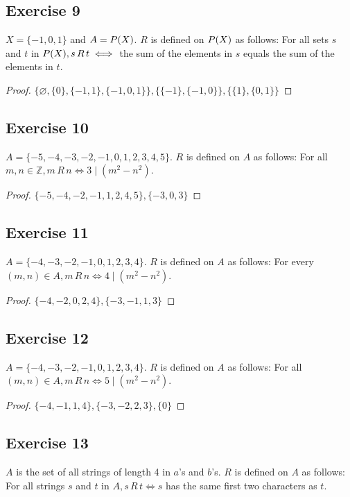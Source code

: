 \documentclass[14pt]{extarticle}
\let\mathscr\relax
\newcommand{\ps}{\mathscr{P}} %
\newcommand{\es}{\varnothing}
\newcommand{\Z}{\mathbb{Z}}
\begin{document}
\subsection{Exercise 9}
\(X = \{-1, 0, 1\}\) and \(A = \ps(X)\). \(R\) is defined on \(\ps(X)\) as follows: For all sets $s$ and $t$ in 
\(\ps(X), s \, R\, t \iff\) the sum of the elements in $s$
equals the sum of the elements in $t$.

\begin{proof}
\(\{\es, \{0\}, \{-1, 1\}, \{-1, 0, 1\}\}, \{\{-1\}, \{-1, 0\}\}, \{\{1\}, \{0, 1\}\}\)
\end{proof}

\subsection{Exercise 10}
\(A = \{-5, -4, -3, -2, -1, 0, 1, 2, 3, 4, 5\}\). \(R\) is defined on \(A\) as follows: For all \(m, n \in \Z, 
m \,R\, n \iff 3 \mid (m^2 - n^2)\).

\begin{proof}
\(\{-5, -4, -2, -1, 1, 2, 4, 5\}, \{-3, 0, 3\}\)
\end{proof}

\subsection{Exercise 11}
\(A = \{-4, -3, -2, -1, 0, 1, 2, 3, 4\}\). \(R\) is defined
on \(A\) as follows: For every \((m, n) \in A, m \,R\, n 
\iff 4 \mid (m^2 - n^2)\).

\begin{proof}
\(\{-4, -2, 0, 2, 4\}, \{-3, -1, 1, 3\}\)
\end{proof}

\subsection{Exercise 12}
\(A = \{-4, -3, -2, -1, 0, 1, 2, 3, 4\}\). \(R\) is defined on \(A\) as follows: For all \((m, n) \in A, m \,R\, n \iff
5 \mid (m^2 - n^2)\).

\begin{proof}
\(\{-4, -1, 1, 4\}, \{-3, -2, 2, 3\}, \{0\}\)
\end{proof}

\subsection{Exercise 13}
\(A\) is the set of all strings of length 4 in \(a\)’s and \(b\)’s. \(R\) is defined on \(A\) as follows: For all 
strings \(s\) and \(t\) in \(A, s \,R\, t \iff s\) has the same first two characters as \(t\).
\end{document}
